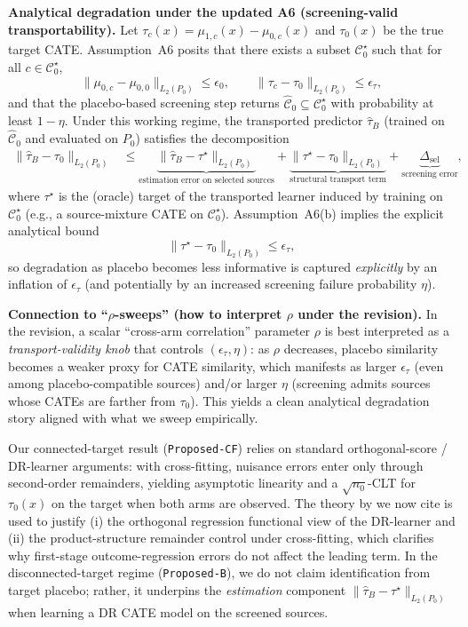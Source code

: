 {\medskip
\noindent\textbf{Analytical degradation under the updated A6 (screening-valid transportability).}
Let $\tau_c(x)=\mu_{1,c}(x)-\mu_{0,c}(x)$ and $\tau_0(x)$ be the true target CATE.
Assumption~A6 posits that there exists a subset $\mathcal{C}_0^\star$ such that for all $c\in\mathcal{C}_0^\star$,
\[
\|\mu_{0,c}-\mu_{0,0}\|_{L_2(P_0)}\le \epsilon_0,
\qquad
\|\tau_c-\tau_0\|_{L_2(P_0)}\le \epsilon_\tau,
\]
and that the placebo-based screening step returns $\widehat{\mathcal{C}}_0\subseteq \mathcal{C}_0^\star$ with probability at least $1-\eta$.
Under this working regime, the transported predictor $\widehat\tau_B$ (trained on $\widehat{\mathcal{C}}_0$ and evaluated on $P_0$) satisfies the decomposition
\begin{align}
\|\widehat\tau_B-\tau_0\|_{L_2(P_0)}
&\le
\underbrace{\|\widehat\tau_B-\tau^\star\|_{L_2(P_0)}}_{\text{estimation error on selected sources}}
+
\underbrace{\|\tau^\star-\tau_0\|_{L_2(P_0)}}_{\text{structural transport term}}
+
\underbrace{\Delta_{\mathrm{sel}}}_{\text{screening error}},
\label{eq:resp_degrade_optB}
\end{align}
where $\tau^\star$ is the (oracle) target of the transported learner induced by training on $\mathcal{C}_0^\star$ (e.g., a source-mixture CATE on $\mathcal{C}_0^\star$).
Assumption~A6(b) implies the explicit analytical bound
\[
\|\tau^\star-\tau_0\|_{L_2(P_0)}\le \epsilon_\tau,
\]
so degradation as placebo becomes less informative is captured \emph{explicitly} by an inflation of $\epsilon_\tau$ (and potentially by an increased screening failure probability $\eta$).

\medskip
\noindent\textbf{Connection to ``$\rho$-sweeps'' (how to interpret $\rho$ under the revision).}
In the revision, a scalar ``cross-arm correlation'' parameter $\rho$ is best interpreted as a \emph{transport-validity knob} that controls $(\epsilon_\tau,\eta)$: as $\rho$ decreases, placebo similarity becomes a weaker proxy for CATE similarity, which manifests as larger $\epsilon_\tau$ (even among placebo-compatible sources) and/or larger $\eta$ (screening admits sources whose CATEs are farther from $\tau_0$). This yields a clean analytical degradation story aligned with what we sweep empirically.

\medskip
Our connected-target result (\texttt{Proposed-CF}) relies on standard orthogonal-score / DR-learner arguments: with cross-fitting, nuisance errors enter only through second-order remainders, yielding asymptotic linearity and a $\sqrt{n_0}$-CLT for $\tau_0(x)$ on the target when both arms are observed. The theory by \cite{tian2023transfer} we now cite is used to justify (i) the orthogonal regression functional view of the DR-learner and (ii) the product-structure remainder control under cross-fitting, which clarifies why first-stage outcome-regression errors do not affect the leading term. In the disconnected-target regime (\texttt{Proposed-B}), we do not claim identification from target placebo; rather, it underpins the \emph{estimation} component $\|\widehat\tau_B-\tau^\star\|_{L_2(P_0)}$ when learning a DR CATE model on the screened sources.

}
